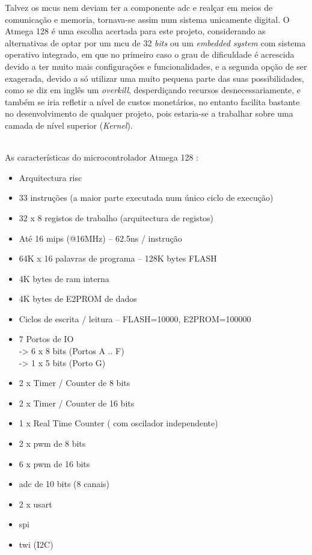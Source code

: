 Talvez os \acp{mcu} nem deviam ter a componente \acs{adc} e realçar em meios de comunicação e memoria, tornava-se assim num sistema unicamente digital.
O Atmega 128 é uma escolha acertada para este projeto, considerando as alternativas de optar por um \ac{mcu} de 32 \textit{bits} ou um \textit{embedded system} com sistema operativo integrado, em que no primeiro caso o grau de dificuldade é acrescida devido a ter muito mais configurações e funcionalidades, e a segunda opção de ser exagerada, devido a só utilizar uma muito pequena parte das suas possibilidades, como se diz em inglês um \textit{overkill}, desperdiçando recursos desnecessariamente, e também se iria refletir a nível de custos monetários, no entanto facilita bastante no desenvolvimento de qualquer projeto, pois estaria-se a trabalhar sobre uma camada de nível superior (\textit{Kernel}).
\\
\\
\begin{minipage}{\linewidth}
As características do microcontrolador Atmega 128 :
\normalsize
\begin{itemize}	
	\setlength\itemsep{-0.3em}
	\item Arquitectura \acs{risc}
	\item 33 instruções (a maior parte executada num único ciclo de execução)
	\item 32 x 8 registos de trabalho (arquitectura de registos)
	\item Até 16 \acs{mips} (@16MHz) – 62.5ns / instrução
	\item 64K x 16 palavras de programa – 128K bytes FLASH
	\item 4K bytes de \acs{ram} interna
	\item 4K bytes de E2PROM de dados
	\item Ciclos de escrita / leitura – FLASH=10000, E2PROM=100000
	\item 7 Portos de IO \\
		\hspace*{.5cm}	-> 6 x 8 bits (Portos A .. F) \\
		\hspace*{.5cm}	-> 1 x 5 bits (Porto G)
	\item 2 x Timer / Counter de 8 bits
	\item 2 x Timer / Counter de 16 bits
	\item 1 x Real Time Counter ( com oscilador independente)
	\item 2 x \acs{pwm} de 8 bits
	\item 6 x \acs{pwm} de 16 bits
	\item \acs{adc} de 10 bits (8 canais)
	\item 2 x \acs{usart}
	\item \acs{spi}
	\item \acs{twi} (I2C)
\end{itemize}
\end{minipage}
